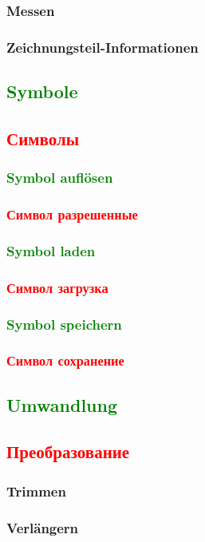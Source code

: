 \documentclass[14pt,a4paper]{book}
\newcommand{\DE}[1]{\textcolor{green}{#1}}
\newcommand{\RU}[1]{\textcolor{red}{#1}}
\begin{document}
			\subsubsection{Messen} 
			\subsubsection{Zeichnungsteil-Informationen} 
		\DE{\subsection{Symbole}}
		\RU{\subsection{Символы}}
			\DE{\subsubsection{Symbol auflösen}}
			\RU{\subsubsection{Символ разрешенные}}
			\DE{\subsubsection{Symbol laden}} 
			\RU{\subsubsection{Символ загрузка}} 
			\DE{\subsubsection{Symbol speichern}} 
			\RU{\subsubsection{Символ сохранение}} 
		\DE{\subsection{Umwandlung}}		
		\RU{\subsection{Преобразование}}		
			\subsubsection{Trimmen} 
			\subsubsection{Verlängern} 
\end{document}
